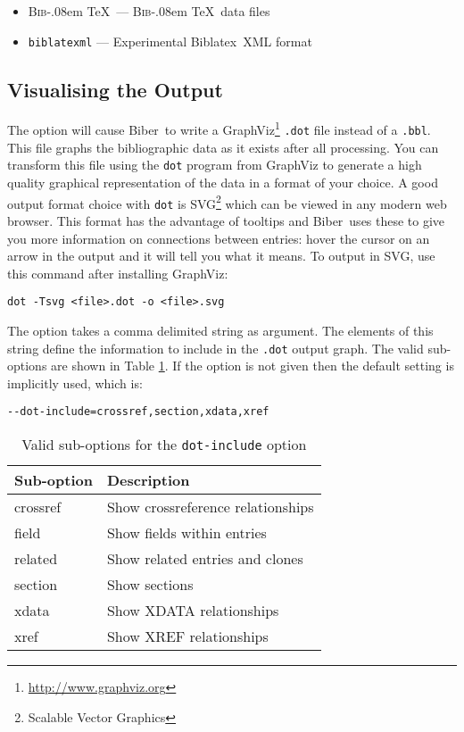 \documentclass{ltxdockit}
\def\BibTeX{\textsc{Bib}\kern-.08em \TeX}
\newcommand*{\biber}{Biber\xspace}
\newcommand*{\biblatex}{Biblatex\xspace}
\begin{document}
\begin{itemize}
\item \BibTeX\ --- \BibTeX\ data files
\item \verb+biblatexml+ --- Experimental \biblatex\ XML format
\end{itemize}

\subsection{Visualising the Output}\label{ref:vis}

The option  will cause \biber\ to write a
GraphViz\footnote{\url{http://www.graphviz.org}} \verb+.dot+ file instead
of a \verb+.bbl+. This file graphs the bibliographic data as it exists
after all processing. You can transform this file using the \verb+dot+
program from GraphViz to generate a high quality graphical representation
of the data in a format of your choice. A good output format choice with
\verb+dot+ is SVG\footnote{Scalable Vector Graphics} which can be viewed in
any modern web browser. This format has the advantage of tooltips and \biber\
uses these to give you more information on connections between entries:
hover the cursor on an arrow in the output and it will tell you what it
means. To output in SVG, use this command after installing GraphViz:

\begin{verbatim}
dot -Tsvg <file>.dot -o <file>.svg
\end{verbatim}

\noindent The  option takes a comma delimited string as
argument. The elements of this string define the information to include in
the \verb+.dot+ output graph. The valid sub-options are shown in Table
\ref{tab:graphopts}. If the \opt{--dot-include} option is not given
then the default setting is implicitly used, which is:

\begin{verbatim}
--dot-include=crossref,section,xdata,xref
\end{verbatim}

\begin{table}
\begin{center}
\small
\begin{tabular}{ll}
\toprule
Sub-option & Description\\
\midrule
crossref & Show crossreference relationships\\
field    & Show fields within entries\\
related  & Show related entries and clones\\
section  & Show sections\\
xdata    & Show XDATA relationships\\
xref     & Show XREF relationships\\
\bottomrule
\end{tabular}
\end{center}
\caption{Valid sub-options for the \texttt{dot-include} option}
\label{tab:graphopts}
\end{table}
\end{document}
